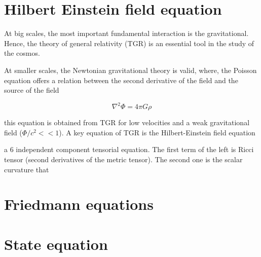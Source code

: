 \section{Hilbert Einstein field equation}

At big scales, the most important fundamental interaction is the 
gravitational. Hence, the theory of general relativity (TGR) is 
an essential tool in the study of the cosmos. 

At smaller scales, the Newtonian gravitational theory is valid, where, 
the Poisson equation offers a relation between the second derivative
of the field and the source of the field 

\[ \nabla^2\Phi=4\pi G\rho\]

this equation is obtained from TGR for low velocities and 
a weak gravitational field ($\Phi/c^2<< 1$). A key equation of TGR is
the Hilbert-Einstein field equation


a 6 independent component tensorial equation. The first term of the left
is Ricci tensor (second derivatives of the metric tensor). The second one 
is the scalar curvature that 

	

\section{ Friedmann equations }



\section{ State equation }




